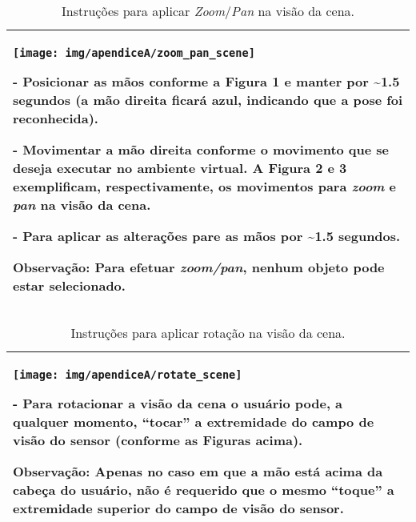 \begin{table}[!htbp]
\caption{Instruções para aplicar \textit{Zoom}/\textit{Pan} na visão da cena.}
\label{tab:instrucoes_zoom_pan}
\begin{center}
\begin{tabular}{| p{14cm} |}
\hline

\begin{center}
\texttt{[image: img/apendiceA/zoom\_pan\_scene]}
\end{center}

- Posicionar as mãos conforme a Figura 1 e manter por \textasciitilde 1.5 segundos (a mão direita ficará azul, indicando que a pose foi reconhecida).

- Movimentar a mão direita conforme o movimento que se deseja executar no ambiente virtual. A Figura 2 e 3 exemplificam, respectivamente, os movimentos para \textit{zoom} e \textit{pan} na visão da cena.

- Para aplicar as alterações pare as mãos por \textasciitilde 1.5 segundos.

\textbf{Observação:} Para efetuar \textit{zoom/pan}, nenhum objeto pode estar selecionado.
\tabularnewline
\hline

\end{tabular}
\end{center}
\end{table}

\begin{table}[!htbp]
\caption{Instruções para aplicar rotação na visão da cena.}
\label{tab:instrucoes_rotacao}
\begin{center}
\begin{tabular}{| p{14cm} |}
\hline

\begin{center}
\texttt{[image: img/apendiceA/rotate\_scene]}
\end{center}

- Para rotacionar a visão da cena o usuário pode, a qualquer momento, ``tocar'' a extremidade do campo de visão do sensor (conforme as Figuras acima).

\textbf{Observação:} Apenas no caso em que a mão está acima da cabeça do usuário, não é requerido que o mesmo ``toque'' a extremidade superior do campo de visão do sensor.
\tabularnewline
\hline

\end{tabular}
\end{center}
\end{table}


